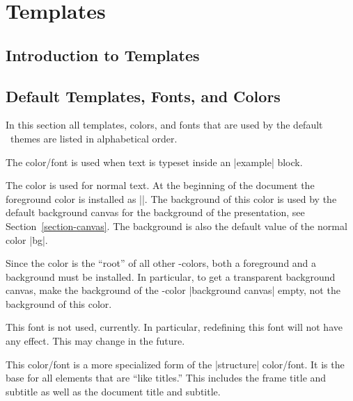 
%


\section{Templates}

\label{section-customization}


\subsection{Introduction to Templates}



\subsection{Default Templates, Fonts, and Colors}

\label{section-color-listing}

In this section all templates, colors, and fonts that are used by the
default \beamer\ themes are listed in alphabetical order. 

\begin{itemize}

  \no\yes\yes
  The color/font is used when text is typeset inside an |example|
  block. 
 
  \no\yes\yes
  The color is used for normal text. At the beginning of
  the document the foreground color is installed as
  |\normalcolor|. The background of this color is used by the
  default background canvas for the background of the
  presentation, see Section~\ref{section-canvas}. The background is
  also the default value of the normal color |bg|. 

  Since the color is the ``root'' of all other \beamer-colors, both a
  foreground and a background must be installed. In particular, to get
  a transparent background canvas, make the background of the
  \beamer-color |background canvas| empty, not the background of this
  color.

  \fontnote
  This font is not used, currently. In particular, redefining this
  font will not have any effect. This may change in the future.

  \no\yes\yes
  This color/font is a more specialized form of the |structure|
  color/font. It is the base for all elements that are ``like
  titles.'' This includes the frame title and subtitle as well as the
  document title and subtitle.
\end{itemize}



